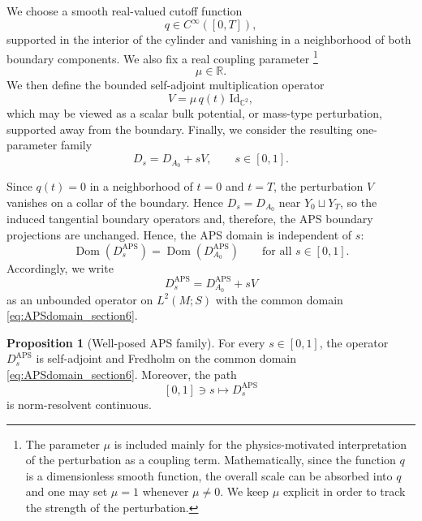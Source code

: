 \documentclass[11pt]{article}
\newcommand{\R}{\mathbb{R}}
\newcommand{\C}{\mathbb{C}}
\theoremstyle{definition}
\newtheorem{proposition}[theorem]{Proposition}
\DeclareMathOperator{\APS}{APS}
\DeclareMathOperator{\Dom}{Dom} \newcommand{\Z}{\mathbb{Z}} \DeclareMathOperator{\Ran}{Ran}
\numberwithin{equation}{section}
\newcommand{\Id}{\text{Id}}
\begin{document}
We choose a smooth real-valued cutoff function
\begin{equation}\label{eq:chi_section6}
q\in C^\infty([0,T]),
\end{equation}
supported in the interior of the cylinder and vanishing in a neighborhood of
both boundary components. We also fix a real coupling parameter%
\footnote{The parameter \(\mu\) is included mainly for the physics-motivated interpretation of the perturbation as a coupling term. Mathematically, since the function \(q\) is a dimensionless smooth function, the overall scale can be absorbed into \(q\) and one may set \(\mu=1\) whenever \(\mu\neq 0\). We keep \(\mu\) explicit in order to track the strength of the perturbation.}
\begin{equation}\label{eq:mu_section6}
\mu\in\R.
\end{equation}
We then define the bounded self-adjoint multiplication operator
\begin{equation}\label{eq:V_section6}
V=\mu\,q(t)\,\Id_{\C^2},
\end{equation}
which may be viewed as a scalar bulk potential, or mass-type perturbation, supported away from the boundary. Finally, we consider the resulting one-parameter family
\begin{equation}\label{eq:Ds_section6}
D_s
=
D_{A_0}+sV,
\qquad
s\in[0,1].
\end{equation}

Since \(q(t)=0\) in a neighborhood of \(t=0\) and \(t=T\), the perturbation $V$ vanishes on a collar of the boundary. Hence \(D_s=D_{A_0}\) near \(Y_0\sqcup Y_T\), so the induced tangential boundary operators and, therefore, the APS boundary projections are unchanged.
Hence, the APS domain is independent of \(s\):
\begin{equation}\label{eq:APSdomain_section6}
\Dom(D_s^{\APS})
=
\Dom(D_{A_0}^{\APS})
\qquad
\text{for all }s\in[0,1].
\end{equation}
Accordingly, we write
\begin{equation}\label{eq:APS_operator_section6}
D_s^{\APS}
=
D_{A_0}^{\APS}+sV
\end{equation}
as an unbounded operator on \(L^2(M;S)\) with the common domain
\eqref{eq:APSdomain_section6}.

\begin{proposition}[Well-posed APS family]
\label{prop:wellposed_section6}
For every \(s\in[0,1]\), the operator \(D_s^{\APS}\) is self-adjoint and Fredholm on the
common domain \eqref{eq:APSdomain_section6}. Moreover, the path
\begin{equation}\label{eq:path_selfadjoint_fredholm_section6}
[0,1]\ni s\longmapsto D_s^{\APS}
\end{equation}
is norm-resolvent continuous.
\end{proposition}
\end{document}
